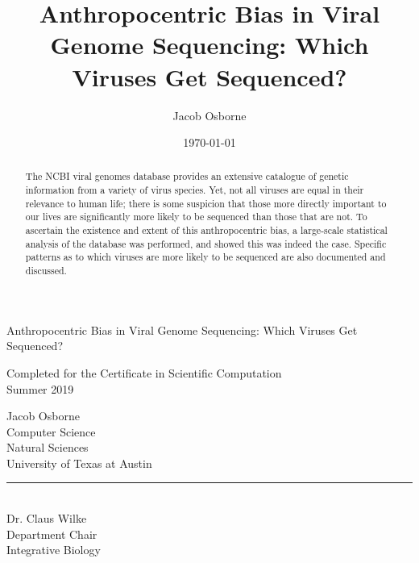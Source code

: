 \documentclass[12pt]{article}
\title{Anthropocentric Bias in Viral Genome Sequencing: Which Viruses Get Sequenced?}
\date{\today}
\author{Jacob Osborne}
\begin{document}
    \begin{titlepage}
        \begin{center}
            \vspace*{1in}
            \LARGE
            Anthropocentric Bias in Viral Genome Sequencing: Which Viruses Get Sequenced?

            \vspace*{1in}
            \large
            Completed for the Certificate in Scientific Computation \\
            Summer 2019

            \vspace*{1in}
            Jacob Osborne \\
            Computer Science \\
            Natural Sciences \\
            University of Texas at Austin

        \end{center}
        
        \vfill

        \noindent
        \rule{4in}{0.2mm} \\
        Dr. Claus Wilke \\
        Department Chair \\ 
        Integrative Biology \\

    \end{titlepage}


    
    \begin{abstract}
        The NCBI viral genomes database provides an extensive catalogue of genetic
        information from a variety of virus species. Yet, not all viruses are equal
        in their relevance to human life; there is some suspicion that those more
        directly important to our lives are significantly more likely to be
        sequenced than those that are not. To ascertain the existence and extent
        of this anthropocentric bias, a large-scale statistical analysis of the
        database was performed, and showed this was indeed the case.
        Specific patterns as to which viruses are more likely  to be sequenced
        are also documented and discussed.
    \end{abstract}
\end{document}
